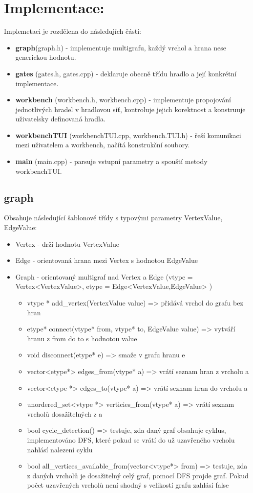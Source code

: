 \documentclass[12pt, oneside]{article}
\begin{document}
\section*{Implementace:}
Implemetaci je rozdělena do následujích částí: 
\begin{itemize}
\item \textbf{graph}(graph.h) - implementuje multigrafu, každý vrchol a hrana nese generickou hodnotu. 
\item \textbf{gates} (gates.h, gates.cpp) - deklaruje obecně třídu hradlo a její konkrétní implementace.
\item \textbf{workbench} (workbench.h, workbench.cpp) -  implementuje propojování jednotlivých hradel v hradlovou síť, kontroluje jejich korektnost a konstruuje uživatelsky definovaná hradla.
\item \textbf{workbenchTUI} (workbenchTUI.cpp, workbench.TUI.h) - řeší komunikaci mezi uživatelem a workbench, načítá konstrukční soubory.
\item \textbf{main} (main.cpp) - parsuje vstupní parametry a spouští metody workbenchTUI.
\end{itemize}
\subsection*{graph} 
Obsahuje následující šablonové třídy s typovými parametry VertexValue, EdgeValue: 
\begin{itemize}
\item Vertex - drží hodnotu VertexValue
\item Edge - orientovaná hrana mezi Vertex s hodnotou EdgeValue
\item Graph - orientovaný multigraf nad Vertex a Edge (vtype = Vertex<VertexValue>, etype = Edge<VertexValue,EdgeValue> )
\begin{itemize}
\item vtype * add\_vertex(VertexValue value) => přidává vrchol  do grafu bez hran
\item etype* connect(vtype* from, vtype* to, EdgeValue value) => vytváří hranu z from do to s hodnotou value
\item void disconnect(etype* e) => smaže v grafu hranu e
\item vector<etype*> edges\_from(vtype* a) => vrátí seznam hran z vrcholu a
\item vector<etype *> edges\_to(vtype* a) => vrátí seznam hran do vrcholu a 
\item unordered\_set<vtype *> verticies\_from(vtype* a) => vrátí seznam vrcholů dosažitelných z a 
\item bool cycle\_detection() => testuje, zda daný graf obsahuje cyklus,  implementováno DFS, které pokud se vrátí do už uzavřeného vrcholu nahlásí nalezení cyklu
\item bool all\_vertices\_available\_from(vector<vtype*> from) => testuje, zda z daných vrcholů je dosažitelný celý graf, pomocí DFS projde graf. Pokud počet uzavřených vrcholů není shodný s velikostí grafu zahlásí false
\end{itemize} 
\end{itemize} 
\end{document}
